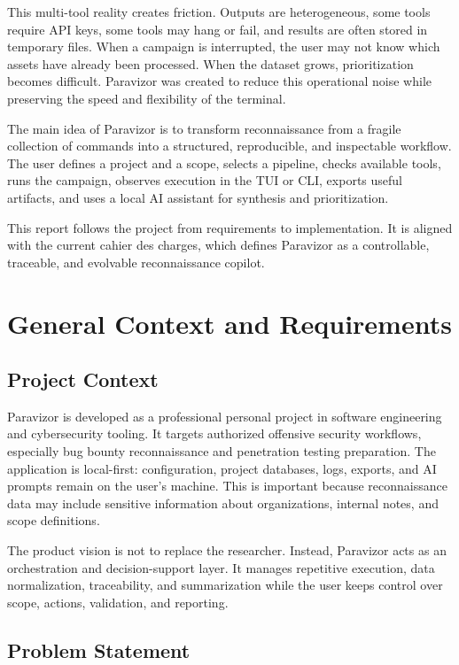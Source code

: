 \documentclass[a4paper,12pt]{article}
\begin{document}
This multi-tool reality creates friction. Outputs are heterogeneous, some tools require API keys, some tools may hang or fail, and results are often stored in temporary files. When a campaign is interrupted, the user may not know which assets have already been processed. When the dataset grows, prioritization becomes difficult. Paravizor was created to reduce this operational noise while preserving the speed and flexibility of the terminal.

The main idea of Paravizor is to transform reconnaissance from a fragile collection of commands into a structured, reproducible, and inspectable workflow. The user defines a project and a scope, selects a pipeline, checks available tools, runs the campaign, observes execution in the TUI or CLI, exports useful artifacts, and uses a local AI assistant for synthesis and prioritization.

This report follows the project from requirements to implementation. It is aligned with the current cahier des charges, which defines Paravizor as a controllable, traceable, and evolvable reconnaissance copilot.

\newpage

\section{General Context and Requirements}

\subsection{Project Context}

Paravizor is developed as a professional personal project in software engineering and cybersecurity tooling. It targets authorized offensive security workflows, especially bug bounty reconnaissance and penetration testing preparation. The application is local-first: configuration, project databases, logs, exports, and AI prompts remain on the user's machine. This is important because reconnaissance data may include sensitive information about organizations, internal notes, and scope definitions.

The product vision is not to replace the researcher. Instead, Paravizor acts as an orchestration and decision-support layer. It manages repetitive execution, data normalization, traceability, and summarization while the user keeps control over scope, actions, validation, and reporting.

\subsection{Problem Statement}
\end{document}
